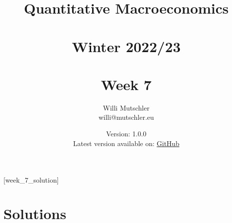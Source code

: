 
\newif\ifDisplaySolutions\DisplaySolutionstrue


\title{Quantitative Macroeconomics\\~\\Winter 2022/23\\~\\Week 7}
\author{Willi Mutschler\\willi@mutschler.eu}
\date{Version: 1.0.0\\Latest version available on: \href{https://github.com/wmutschl/Quantitative-Macroeconomics/releases/latest/download/week_7.pdf}{GitHub}}
\maketitle\thispagestyle{empty}

\newpage
{}[week_7_solution]
\tableofcontents\thispagestyle{empty}\newpage

\setcounter{page}{1}
\newpage
\newpage
\newpage
\printbibliography
\newpage

\ifDisplaySolutions
\newpage
\appendix
\section{Solutions}

\fi
